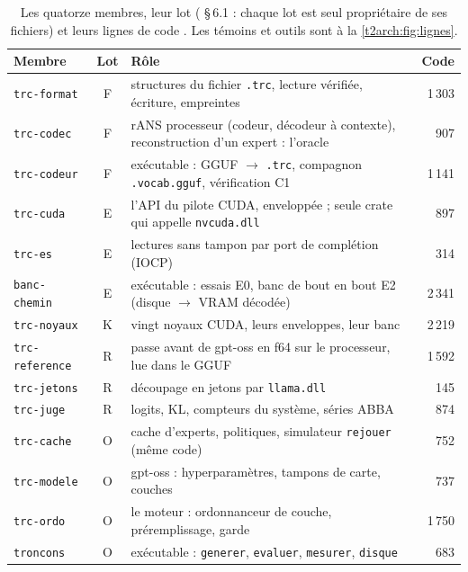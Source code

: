 \begin{table}[ht]
\centering\small
\begin{tabularx}{\linewidth}{l c >{\raggedright\arraybackslash}X r}
\toprule
Membre & Lot & Rôle & Code \\
\midrule
\texttt{trc-format} & F & structures du fichier \texttt{.trc}, lecture vérifiée, écriture, empreintes & 1\,303 \\
\texttt{trc-codec} & F & rANS processeur (codeur, décodeur à contexte), reconstruction d'un expert : l'oracle & 907 \\
\texttt{trc-codeur} & F & exécutable : GGUF $\to$ \texttt{.trc}, compagnon \texttt{.vocab.gguf}, vérification C1 & 1\,141 \\
\texttt{trc-cuda} & E & l'API du pilote CUDA, enveloppée ; seule crate qui appelle \texttt{nvcuda.dll} & 897 \\
\texttt{trc-es} & E & lectures sans tampon par port de complétion (IOCP) & 314 \\
\texttt{banc-chemin} & E & exécutable : essais E0, banc de bout en bout E2 (disque $\to$ VRAM décodée) & 2\,341 \\
\texttt{trc-noyaux} & K & vingt noyaux CUDA, leurs enveloppes, leur banc & 2\,219 \\
\texttt{trc-reference} & R & passe avant de gpt-oss en f64 sur le processeur, lue dans le GGUF & 1\,592 \\
\texttt{trc-jetons} & R & découpage en jetons par \texttt{llama.dll} & 145 \\
\texttt{trc-juge} & R & logits, KL, compteurs du système, séries ABBA & 874 \\
\texttt{trc-cache} & O & cache d'experts, politiques, simulateur \texttt{rejouer} (même code) & 752 \\
\texttt{trc-modele} & O & gpt-oss : hyperparamètres, tampons de carte, couches & 737 \\
\texttt{trc-ordo} & O & le moteur : ordonnanceur de couche, préremplissage, garde & 1\,750 \\
\texttt{troncons} & O & exécutable : \texttt{generer}, \texttt{evaluer}, \texttt{mesurer}, \texttt{disque} & 683 \\
\bottomrule
\end{tabularx}
\caption[Les membres de l'espace de travail]{Les quatorze membres, leur lot ( §\,6.1 : chaque lot est seul propriétaire de ses fichiers) et leurs lignes de code \calc. Les témoins et outils sont à la \cref{t2arch:fig:lignes}.}
\label{t2arch:tab:caisses}
\end{table}

